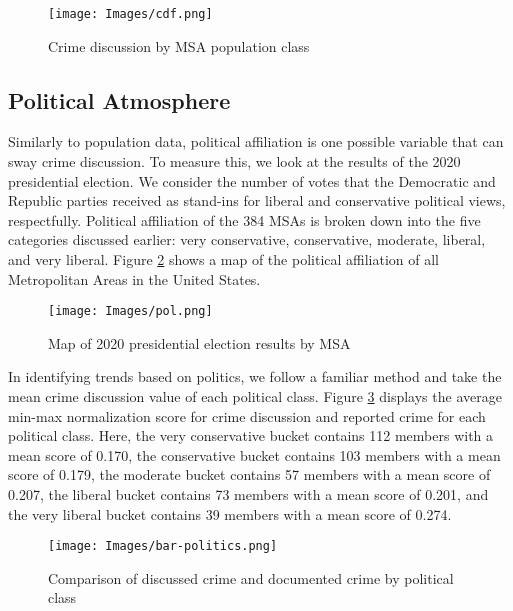 \documentclass[12pt,oneside, letterpaper]{book}
\begin{document}
\begin{figure}[ht]
    \centering
    \texttt{[image: Images/cdf.png]}
    \caption{Crime discussion by MSA population class}
    \label{fig:cdf-1}
\end{figure}

\subsection{Political Atmosphere}

\par Similarly to population data, political affiliation is one possible variable that can sway crime discussion. To measure this, we look at the results of the 2020 presidential election. We consider the number of votes that the Democratic and Republic parties received as stand-ins for liberal and conservative political views, respectfully. Political affiliation of the 384 MSAs is broken down into the five categories discussed earlier: very conservative, conservative, moderate, liberal, and very liberal. Figure \ref{fig:map-2} shows a map of the political affiliation of all Metropolitan Areas in the United States.

\begin{figure}[ht]
    \texttt{[image: Images/pol.png]}
    \caption{Map of 2020 presidential election results by MSA}
    \label{fig:map-2}
\end{figure}

\par In identifying trends based on politics, we follow a familiar method and take the mean crime discussion value of each political class. Figure \ref{fig:graph-2} displays the average min-max normalization score for crime discussion and reported crime for each political class. Here, the very conservative bucket contains 112 members with a mean score of 0.170, the conservative bucket contains 103 members with a mean score of 0.179, the moderate bucket contains 57 members with a mean score of 0.207, the liberal bucket contains 73 members with a mean score of 0.201, and the very liberal bucket contains 39 members with a mean score of 0.274.

\begin{figure}[ht]
    \centering
    \texttt{[image: Images/bar-politics.png]}
    \caption{Comparison of discussed crime and documented crime by political class}
    \label{fig:graph-2}
\end{figure}
\end{document}
